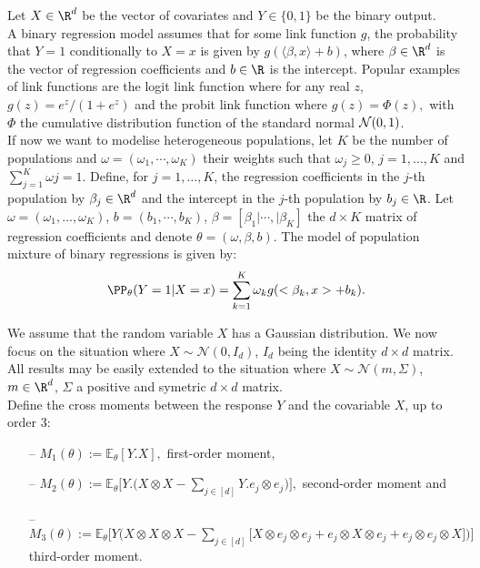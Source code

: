 \noindent
Let $X\in \R^{d}$ be the vector of covariates and $Y\in \{0,1\}$ be the binary output. \\

\noindent
A binary regression model assumes that for some link function $g$, the probability that $Y=1$ conditionally to $X=x$ is given by $g(\langle \beta , x \rangle +b)$, where $\beta\in \R^{d}$ is the vector of regression coefficients and $b\in\R$ is the intercept. Popular examples of link functions are the logit link function where for any real $z$,  $g(z)=e^z/(1+e^z)$ and the probit link function where $g(z)=\Phi(z),$  with $\Phi$  the cumulative distribution function of the standard normal ${\cal N}(0,1)$. \\
If now we want to modelise heterogeneous populations, let $K$ be the number of populations and $\omega=(\omega_1,\cdots,\omega_K)$ their weights such that $\omega_{j}\geq 0$, $j=1,\ldots,K$ and $\sum_{j=1}^{K}\omega{j}=1$. Define, for $j=1,\ldots,K$, the regression coefficients in the $j$-th population by $\beta_{j}\in\R^{d}$ and the intercept in the $j$-th population by $b_{j}\in\R$. Let $\omega =(\omega_{1},\ldots,\omega_{K})$,   $b=(b_1,\cdots,b_K)$, $\beta=[\beta_{1} \vert \cdots,\vert \beta_K]$ the $d\times K$ matrix of regression coefficients and denote $\theta=(\omega,\beta,b)$.
The model of population mixture of binary regressions is given by:
\begin{equation}
\label{mixturemodel1}
\PP_{\theta}(Y=1\vert X=x)=\sum^{K}_{k=1}\omega_k g(<\beta_k,x>+b_k).
\end{equation}

\noindent
We assume that the random variable $X$ has a Gaussian distribution. We now focus on the situation where $X\sim \mathcal{N}(0,I_d)$, $I_d$ being the identity $d\times d$ matrix. All results may be easily extended to the situation where $X\sim \mathcal{N}(m,\Sigma)$, $m\in \R^{d}$, $\Sigma$ a positive and symetric $d\times d$ matrix. \\

\noindent
Define the cross moments between the response $Y$ and the covariable $X$, up to order $3$:

\begin{itemize}
\item[--] $M_1(\theta):=\mathbb{E}_{\theta}[Y.X],$ first-order  moment,
\item[--] $M_2(\theta):=\mathbb{E}_{\theta}\Big[Y.\big(X\otimes X-\sum_{j\in[d]}Y.e_j\otimes e_j\big)\Big],$ second-order moment and
\item[--] $M_3(\theta):=\mathbb{E}_{\theta}\Big[Y\big(X\otimes X\otimes X-\sum_{j\in[d]}\big[X\otimes e_j\otimes e_j+e_j\otimes X\otimes e_j+e_j\otimes e_j\otimes X\big]\big)\Big]
 $ third-order moment.
 \end{itemize}

